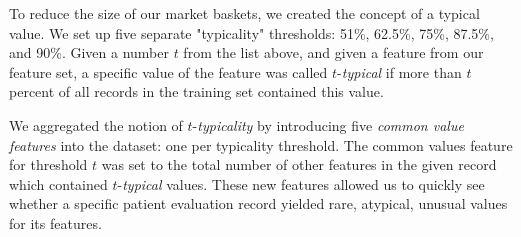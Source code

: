 To reduce the size of our market baskets, we created the concept of a \textsf{typical value}. We set up five separate "typicality" thresholds: 51\%, 62.5\%,
75\%, 87.5\%, and 90\%.  Given a number $t$ from the list above, and given
a feature from our feature set,
a specific value of the feature was called $t$-\textit{typical} if more
than $t$ percent of all records in the training set contained this value.

We aggregated the notion of $t$-\textit{typicality} by introducing
five \textit{common value features} into the dataset: one per typicality
threshold. The common values feature for threshold $t$ was set to the total number of other features in the given record which contained $t$-\textit{typical} values.
These new features allowed us to quickly see whether a specific patient
evaluation record yielded rare, atypical, unusual values for its features.

 